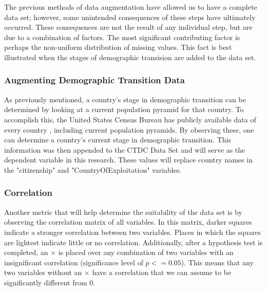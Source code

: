 \documentclass{article} %
\begin{document}
The previous methods of data augmentation have allowed us to have a complete data set; however, some unintended consequences of these steps have ultimately occurred. These consequences are not the result of any individual step, but are due to a combination of factors. The most significant contributing factor is perhaps the non-uniform distribution of missing values. This fact is best illustrated when the stages of demographic transision are added to the data set. 

\subsubsection{Augmenting Demographic Transition Data}

As previously mentioned, a country's stage in demographic transition can be determined by looking at a current population pyramid for that country. To accomplish this, the United States Census Bureau has publicly available data of every country \parencite{USCB}, including current population pyramids. By observing these, one can determine a country's current stage in demographic transition. This information was then appended to the CTDC Data Set and will serve as the dependent variable in this research. These values will replace country names in the "citizenship" and "CountryOfExploitation" variables.

\subsubsection{Correlation}

Another metric that will help determine the suitability of the data set is by observing the correlation matrix of all variables. In this matrix, darker squares indicate a stronger correlation between two variables. Places in which the squares are lightest indicate little or no correlation. Additionally, after a hypothesis test is completed, an $\times$ is placed over any combination of two variables with an insignificant correlation (significance level of $p <= 0.05$). This means that any two variables without an $\times$ have a correlation that we can assume to be significantly different from 0.
\end{document}
